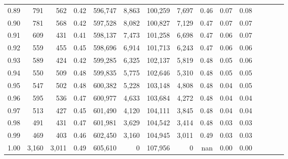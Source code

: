 \begin{tabular}{rrrcrrrrrrrrrrr}
0.89 &     791 &    562 &                                       0.42 &  596,747 &    8,863 &  100,259 &    7,697 &  0.46 &  0.07 &                         0.08 \\
0.90 &     781 &    568 &                                       0.42 &  597,528 &    8,082 &  100,827 &    7,129 &  0.47 &  0.07 &                         0.07 \\
0.91 &     609 &    431 &                                       0.41 &  598,137 &    7,473 &  101,258 &    6,698 &  0.47 &  0.06 &                         0.07 \\
0.92 &     559 &    455 &                                       0.45 &  598,696 &    6,914 &  101,713 &    6,243 &  0.47 &  0.06 &                         0.06 \\
0.93 &     589 &    424 &                                       0.42 &  599,285 &    6,325 &  102,137 &    5,819 &  0.48 &  0.05 &                         0.06 \\
0.94 &     550 &    509 &                                       0.48 &  599,835 &    5,775 &  102,646 &    5,310 &  0.48 &  0.05 &                         0.05 \\
0.95 &     547 &    502 &                                       0.48 &  600,382 &    5,228 &  103,148 &    4,808 &  0.48 &  0.04 &                         0.05 \\
0.96 &     595 &    536 &                                       0.47 &  600,977 &    4,633 &  103,684 &    4,272 &  0.48 &  0.04 &                         0.04 \\
0.97 &     513 &    427 &                                       0.45 &  601,490 &    4,120 &  104,111 &    3,845 &  0.48 &  0.04 &                         0.04 \\
0.98 &     491 &    431 &                                       0.47 &  601,981 &    3,629 &  104,542 &    3,414 &  0.48 &  0.03 &                         0.03 \\
0.99 &     469 &    403 &                                       0.46 &  602,450 &    3,160 &  104,945 &    3,011 &  0.49 &  0.03 &                         0.03 \\
1.00 &   3,160 &  3,011 &                                       0.49 &  605,610 &        0 &  107,956 &        0 &   nan &  0.00 &                         0.00 \\
\bottomrule
\end{tabular}
